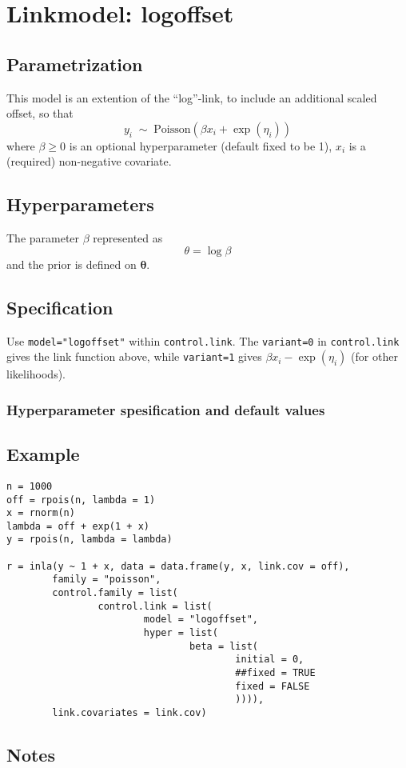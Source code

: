 \documentclass[a4paper,11pt]{article}
\begin{document}
\section*{Linkmodel: logoffset}

\subsection*{Parametrization}

This model is an extention of the ``log''-link, to include an
additional scaled offset, so that
\begin{displaymath}
    y_{i} \;\sim\; \text{Poisson}(\beta x_{i} + \exp(\eta_{i}))
\end{displaymath}
where $\beta \ge 0$ is an optional hyperparameter (default fixed to be 1),
$x_{i}$ is a (required) non-negative covariate.


\subsection*{Hyperparameters}

The  parameter $\beta$ represented as
\begin{displaymath}
    \theta =\log \beta
\end{displaymath}
and the prior is defined on $\mathbf{\theta}$.

\subsection*{Specification}

Use \texttt{model="logoffset"} within \texttt{control.link}.  The
\texttt{variant=0} in \texttt{control.link} gives the link function
above, while \texttt{variant=1} gives $\beta x_{i} - \exp(\eta_{i})$
(for other likelihoods).

\subsubsection*{Hyperparameter spesification and default values}


\subsection*{Example}

\begin{verbatim}
n = 1000
off = rpois(n, lambda = 1)
x = rnorm(n)
lambda = off + exp(1 + x)
y = rpois(n, lambda = lambda)

r = inla(y ~ 1 + x, data = data.frame(y, x, link.cov = off),
        family = "poisson",
        control.family = list(
                control.link = list(
                        model = "logoffset", 
                        hyper = list(
                                beta = list(
                                        initial = 0, 
                                        ##fixed = TRUE
                                        fixed = FALSE
                                        )))), 
        link.covariates = link.cov)
\end{verbatim}


\subsection*{Notes}
\end{document}
